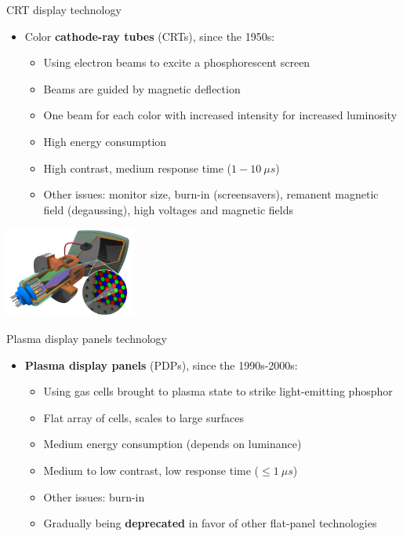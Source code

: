 \begin{frame}{CRT display technology}
  \begin{itemize}
  \item Color \textbf{cathode-ray tubes} (CRTs), since the 1950s:
    \begin{itemize}
    \item Using electron beams to excite a phosphorescent screen
    \item Beams are guided by magnetic deflection
    \item One beam for each color with increased intensity for increased luminosity
    \item High energy consumption
    \item High contrast, medium response time (\(1-10~\mu s\))
    \item Other issues: monitor size, burn-in (screensavers), remanent magnetic field (degaussing), high voltages and magnetic fields
    \end{itemize}
  \end{itemize}

  \begin{center}
  \includegraphics[height=8em]{slides/graphics-introduction/crt-color.png}
  \end{center}
\end{frame}

\begin{frame}{Plasma display panels technology}
  \begin{itemize}
  \item \textbf{Plasma display panels} (PDPs), since the 1990s-2000s:
    \begin{itemize}
    \item Using gas cells brought to plasma state to strike light-emitting phosphor
    \item Flat array of cells, scales to large surfaces
    \item Medium energy consumption (depends on luminance)
    \item Medium to low contrast, low response time (\(\leq 1~\mu s\))
    \item Other issues: burn-in
    \item Gradually being \textbf{deprecated} in favor of other flat-panel technologies
    \end{itemize}
  \end{itemize}
\end{frame}

